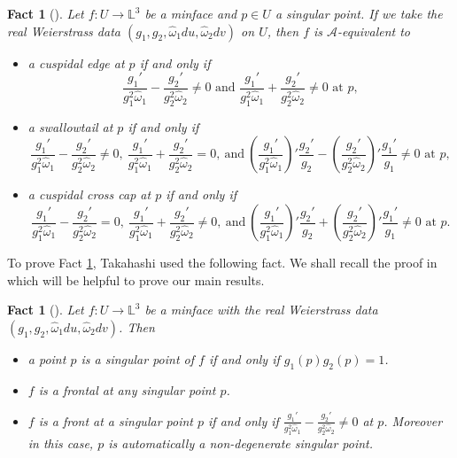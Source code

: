 \documentclass[11pt,reqno]{amsart}
\theoremstyle{plain} %
\newtheorem{fact}[theorem]{Fact}
\theoremstyle{definition}
\begin{document}
\begin{fact}[\cite{T}]\label{Fact: T-lemma}
Let $f:U \longrightarrow \mathbb{L}^3$ be a minface and $p\in U$ a singular point. If we take the real Weierstrass data $(g_1, g_2,\hat{\omega}_1du, \hat{\omega}_2dv)$ on $U$, then $f$ is $\mathcal{A}$-equivalent to 
\begin{itemize}
\item[(i)] a cuspidal edge at $p$ if and only if $$\frac{g_1'}{g_1^2\hat{\omega}_1}-\frac{g_2'}{g_2^2\hat{\omega}_2}\neq 0\text{ and }\frac{g_1'}{g_1^2\hat{\omega}_1}+\frac{g_2'}{g_2^2\hat{\omega}_2}\neq0\text{ at } p,$$
\item[(ii)] a swallowtail at $p$ if and only if $$\frac{g_1'}{g_1^2\hat{\omega}_1}-\frac{g_2'}{g_2^2\hat{\omega}_2}\neq 0,\ \frac{g_1'}{g_1^2\hat{\omega}_1}+\frac{g_2'}{g_2^2\hat{\omega}_2}=0,\ \text{and}\ \left(\frac{g_1'}{g_1^2\hat{\omega}_1}\right)'\frac{g_2'}{g_2}-\left(\frac{g_2'}{g_2^2\hat{\omega}_2}\right)'\frac{g_1'}{g_1}\neq 0\text{ at }p,$$

\item[(iii)] a cuspidal cross cap at $p$ if and only if $$\frac{g_1'}{g_1^2\hat{\omega}_1}-\frac{g_2'}{g_2^2\hat{\omega}_2}=0,\ \frac{g_1'}{g_1^2\hat{\omega}_1}+\frac{g_2'}{g_2^2\hat{\omega}_2}\neq0,\ \text{and}\ \left(\frac{g_1'}{g_1^2\hat{\omega}_1}\right)'\frac{g_2'}{g_2}+\left(\frac{g_2'}{g_2^2\hat{\omega}_2}\right)'\frac{g_1'}{g_1}\neq0\text{ at }p.$$

\end{itemize}
\end{fact}

To prove Fact \ref{Fact: T-lemma}, Takahashi used the following fact. We shall recall the proof in \cite{T} which will be helpful to prove our main results. 
\begin{fact}[\cite{T}]\label{Lemma T-2}
Let $f:U \longrightarrow \mathbb{L}^3$ be a minface with the real Weierstrass data $(g_1, g_2,\hat{\omega}_1du, \hat{\omega}_2dv)$. Then
\begin{itemize}
\item[(i)]  a point $p$ is a singular point of $f$ if and only if $g_1(p)g_2(p)=1$.
\item[(ii)] $f$ is a frontal at any singular point $p$.
\item[(iii)] $f$ is a front at a singular point $p$ if and only if $\frac{g_1'}{g_1^2\hat{\omega}_1}-\frac{g_2'}{g_2^2\hat{\omega}_2}\neq 0$ at $p$. Moreover in this case, $p$ is automatically a non-degenerate singular point.
\end{itemize}
\end{fact}
\end{document}

